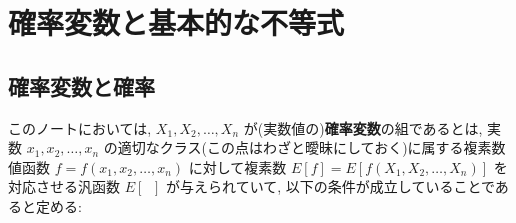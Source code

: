 \documentclass[12pt,twoside]{jarticle}
\theoremstyle{jplain}
\theoremstyle{jplain}
\theoremstyle{jplain}
\numberwithin{theorem}{section}
\numberwithin{equation}{section}
\numberwithin{figure}{section}
\numberwithin{table}{section}
\begin{document}
\title{\TITLE}
\author{\AUTHOR}
\date{\DATE}
\maketitle
\begin{abstract}
\noindent
このノートでは, 測度論を可能な限り用いずに, 期待値汎函数 $E[\;\;]$ に関する一般的な性質のみを仮定して, Jensenの不等式, Chebyshevの不等式, 大数の(弱)法則, 中心極限定理を証明する. 中心極限定理は, 特性函数やモーメント母函数を使わずに, 本質的にTaylorの定理しか使わない初等的な方法で証明される.
\end{abstract}
\tableofcontents

\section{確率変数と基本的な不等式}

\subsection{確率変数と確率}

このノートにおいては, $X_1,X_2,\ldots,X_n$ が(実数値の){\bfseries 確率変数}の組であるとは, 実数 $x_1,x_2,\ldots,x_n$ の適切なクラス(この点はわざと曖昧にしておく)に属する複素数値函数 $f=f(x_1,x_2,\ldots,x_n)$ に対して複素数 $E[f]=E[f(X_1,X_2,\ldots,X_n)]$ を対応させる汎函数 $E[\;\;]$ が与えられていて, 以下の条件が成立していることであると定める:
\end{document}
